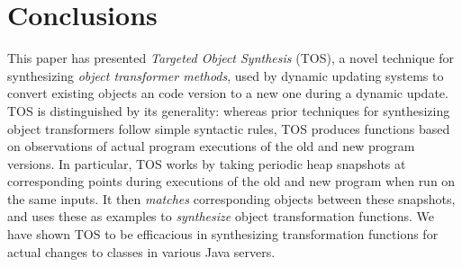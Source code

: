 \documentclass[natbib]{sigplanconf}
\newcommand{\TOSAcronym}{\emph{Targeted Object Synthesis} (TOS)\xspace}
\newcommand{\TOS}{TOS\xspace}
\begin{document}

\section{Conclusions}

This paper has presented \TOSAcronym, a novel technique for
synthesizing \emph{object transformer methods}, used by dynamic
updating systems to convert existing objects an code version to a new
one during a dynamic update.  \TOS is distinguished by its generality:
whereas prior techniques for synthesizing object transformers follow
simple syntactic rules, \TOS produces functions based on observations
of actual program executions of the old and new program versions.  In
particular, \TOS works by taking periodic heap snapshots at
corresponding points during executions of the old and new program when
run on the same inputs.  It then \emph{matches} corresponding objects
between these snapshots, and uses these as examples to
\emph{synthesize} object transformation functions.  We have shown \TOS to
be efficacious in synthesizing transformation functions for actual
changes to classes in various Java servers.  






%
\end{document}
